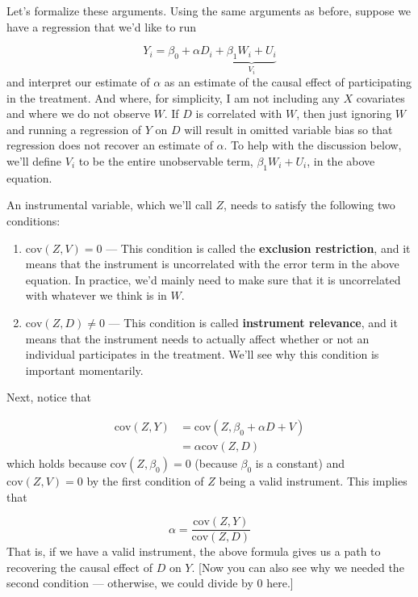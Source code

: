 \documentclass[
  letterpaper,
  DIV=11,
  numbers=noendperiod]{scrreprt}
\begin{document}
Let's formalize these arguments. Using the same arguments as before,
suppose we have a regression that we'd like to run

\[
  Y_i = \beta_0 + \alpha D_i + \underbrace{\beta_1 W_i + U_i}_{V_i}
\] and interpret our estimate of \(\alpha\) as an estimate of the causal
effect of participating in the treatment. And where, for simplicity, I
am not including any \(X\) covariates and where we do not observe \(W\).
If \(D\) is correlated with \(W\), then just ignoring \(W\) and running
a regression of \(Y\) on \(D\) will result in omitted variable bias so
that regression does not recover an estimate of \(\alpha\). To help with
the discussion below, we'll define \(V_i\) to be the entire unobservable
term, \(\beta_1 W_i + U_i\), in the above equation.

An instrumental variable, which we'll call \(Z\), needs to satisfy the
following two conditions:

\begin{enumerate}
\def\labelenumi{\arabic{enumi}.}
\item
  \(\mathrm{cov}(Z,V) = 0\) --- This condition is called the
  \textbf{exclusion restriction}, and it means that the instrument is
  uncorrelated with the error term in the above equation. In practice,
  we'd mainly need to make sure that it is uncorrelated with whatever we
  think is in \(W\).
\item
  \(\mathrm{cov}(Z,D) \neq 0\) --- This condition is called
  \textbf{instrument relevance}, and it means that the instrument needs
  to actually affect whether or not an individual participates in the
  treatment. We'll see why this condition is important momentarily.
\end{enumerate}

Next, notice that

\[
  \begin{aligned}
  \mathrm{cov}(Z,Y) &= \mathrm{cov}(Z,\beta_0 + \alpha D + V) \\
  &= \alpha \mathrm{cov}(Z,D)
  \end{aligned}
\] which holds because \(\mathrm{cov}(Z,\beta_0) = 0\) (because
\(\beta_0\) is a constant) and \(\mathrm{cov}(Z,V)=0\) by the first
condition of \(Z\) being a valid instrument. This implies that

\[
  \alpha = \frac{\mathrm{cov}(Z,Y)}{\mathrm{cov}(Z,D)}
\] That is, if we have a valid instrument, the above formula gives us a
path to recovering the causal effect of \(D\) on \(Y\). {[}Now you can
also see why we needed the second condition --- otherwise, we could
divide by 0 here.{]}
\end{document}
